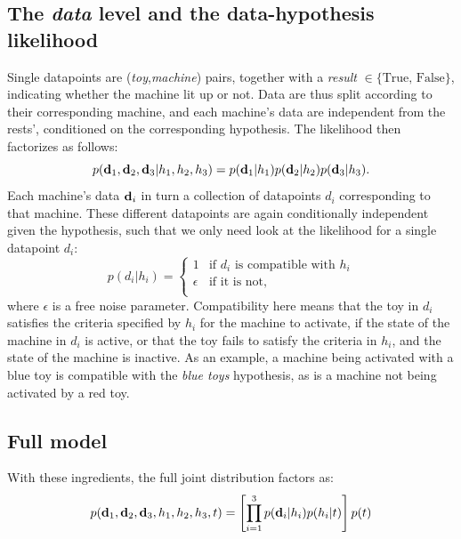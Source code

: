 \documentclass[11pt, a4paper]{article}
\begin{document}
\subsection*{The \emph{data} level and the data-hypothesis likelihood}
Single datapoints are (\emph{toy},\emph{machine}) pairs, together with a \emph{result} $\in\{ \textrm{True, False} \}$, indicating whether the machine lit up or not. Data are thus split according to their corresponding machine, and each machine's data are independent from the rests', conditioned on the corresponding hypothesis. The likelihood then factorizes as follows:
\begin{equation}
p(\textbf d_1, \textbf d_2, \textbf d_3| h_1, h_2, h_3)=p(\textbf d_1| h_1)p(\textbf d_2| h_2)p(\textbf d_3| h_3).
\end{equation}
Each machine's data $\textbf d_i$ in turn a collection of datapoints $d_i$ corresponding to that machine. These different datapoints are again conditionally independent given the hypothesis, such that we only need look at the likelihood for a single datapoint $d_i$:
\begin{equation}
p(d_i| h_i)= \begin{cases} 
				1  & \textrm{if $d_i$ is compatible with  $h_i$} \\
                   	\epsilon &  \textrm{if it is not}, \\
                   \end{cases}
\end{equation}
where $\epsilon$ is a free noise parameter. Compatibility here means that the toy in $d_i$ satisfies the criteria specified by $h_i$ for the machine to activate, if the state of the machine in $d_i$ is active, or that the toy fails to satisfy the criteria in $h_i$, and the state of the machine is inactive. As an example, a machine being activated with a blue toy is compatible with the \emph{blue toys} hypothesis, as is a machine not being activated by a red toy. 

\subsection*{Full model}
With these ingredients, the full joint distribution factors as:
\begin{equation}
p(\textbf d_1,\textbf d_2,\textbf d_3,h_1,h_2,h_3,t)=\left[\prod_{i=1}^3 p(\textbf d_i|h_i) p(h_i|t) \right]p(t)
\end{equation}
\end{document}
